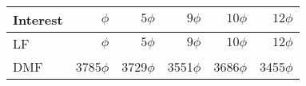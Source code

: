 \begin{tabular}{l|rrrrr}
Interest & $\phi$ & $5\phi$ & $9\phi$ & $10\phi$ & $12\phi$\\\hline
LF & $\phi$ & $5\phi$ & $9\phi$ & $10\phi$ & $12\phi$\\
DMF& 3785$\phi$ & 3729$\phi$ & 3551$\phi$ & 3686$\phi$ & 3455$\phi$\\
\end{tabular}